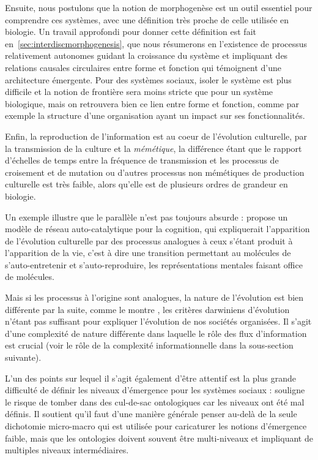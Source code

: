 Ensuite, nous postulons que la notion de morphogenèse est un outil essentiel pour comprendre ces systèmes, avec une définition très proche de celle utilisée en biologie. Un travail approfondi pour donner cette définition est fait en~\ref{sec:interdiscmorphogenesis}, que nous résumerons en l'existence de processus relativement autonomes guidant la croissance du système et impliquant des relations causales circulaires entre forme et fonction qui témoignent d'une architecture émergente. Pour des systèmes sociaux, isoler le système est plus difficile et la notion de frontière sera moins stricte que pour un système biologique, mais on retrouvera bien ce lien entre forme et fonction, comme par exemple la structure d'une organisation ayant un impact sur ses fonctionnalités.


Enfin, la reproduction de l'information est au coeur de l'évolution culturelle, par la transmission de la culture et la \emph{mémétique}, la différence étant que le rapport d'échelles de temps entre la fréquence de transmission et les processus de croisement et de mutation ou d'autres processus non mémétiques de production culturelle est très faible, alors qu'elle est de plusieurs ordres de grandeur en biologie.


Un exemple illustre que le parallèle n'est pas toujours absurde :\cite{2017arXiv170305917G} propose un modèle de réseau auto-catalytique pour la cognition, qui expliquerait l'apparition de l'évolution culturelle par des processus analogues à ceux s'étant produit à l'apparition de la vie, c'est à dire une transition permettant au molécules de s'auto-entretenir et s'auto-reproduire, les représentations mentales faisant office de molécules.


Mais si les processus à l'origine sont analogues, la nature de l'évolution est bien différente par la suite, comme le montre \cite{vanderLeeuw2009}, les critères darwiniens d'évolution n'étant pas suffisant pour expliquer l'évolution de nos sociétés organisées. Il s'agit d'une complexité de nature différente dans laquelle le rôle des flux d'information est crucial (voir le rôle de la complexité informationnelle dans la sous-section suivante). 


L'un des points sur lequel il s'agit également d'être attentif est la plus grande difficulté de définir les niveaux d'émergence pour les systèmes sociaux : \cite{roth2009reconstruction} souligne le risque de tomber dans des cul-de-sac ontologiques car les niveaux ont été mal définis. Il soutient qu'il faut d'une manière générale penser au-delà de la seule dichotomie micro-macro qui est utilisée pour caricaturer les notions d'émergence faible, mais que les ontologies doivent souvent être multi-niveaux et impliquant de multiples niveaux intermédiaires.


